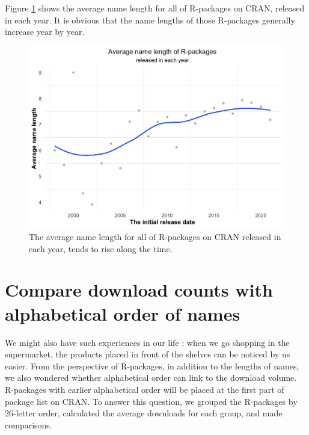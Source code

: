\documentclass[
]{book}
\begin{document}
Figure \ref{fig:avgnamelth-year} shows the average name length for all of R-packages on CRAN, released in each year. It is obvious that the name lengths of those R-packages generally increase year by year.



\begin{figure}

{\centering \includegraphics{figures/avgnamelth-year-1} 

}

\caption{The average name length for all of R-packages on CRAN released in each year, tends to rise along the time.}\label{fig:avgnamelth-year}
\end{figure}

\hypertarget{compare-download-counts-with-alphabetical-order-of-names}{%
\section{Compare download counts with alphabetical order of names}\label{compare-download-counts-with-alphabetical-order-of-names}}

We might also have such experiences in our life : when we go shopping in the supermarket, the products placed in front of the shelves can be noticed by us easier. From the perspective of R-packages, in addition to the lengths of names, we also wondered whether alphabetical order can link to the download volume. R-packages with earlier alphabetical order will be placed at the first part of package list on CRAN\autocite{cranpkgsname}. To answer this question, we grouped the R-packages by 26-letter order, calculated the average downloads for each group, and made comparisons.
\end{document}
